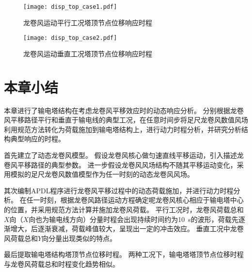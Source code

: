 \begin{figure}[!htpb]
    \centering
    \texttt{[image: disp\_top\_case1.pdf]}
    \caption{龙卷风运动平行工况塔顶节点位移响应时程}
    \label{fig:disp_top_case1}
\end{figure}

\begin{figure}[!htpb]
    \centering
    \texttt{[image: disp\_top\_case2.pdf]}
    \caption{龙卷风运动垂直工况塔顶节点位移响应时程}
    \label{fig:disp_top_case2}
\end{figure}

\section{本章小结}
本章进行了输电塔结构在考虑龙卷风平移效应时的动态响应分析。
分别根据龙卷风平移路径平行和垂直于输电线的典型工况，在任意时间步将足尺龙卷风数值风场利用规范方法转化为荷载施加到输电塔结构上，进行动力时程分析，并研究分析结构典型响应的时程。

首先建立了动态龙卷风模型。
假设龙卷风核心做匀速直线平移运动，引入描述龙卷风平移路径的典型参数。
进一步假设龙卷风风场结构不随其平移运动变化，采用模拟的足尺龙卷风数值模型作为任一时刻的动态龙卷风风场。

其次编制APDL程序进行龙卷风平移过程中的动态荷载施加，并进行动力时程分析。
在任一时刻，根据龙卷风路径运动方程确定呢龙卷风核心相应于输电塔中心的位置，并采用规范方法计算并施加龙卷风荷载。
平行工况时，龙卷风荷载总和$X$向（$X$向也为输电线方向）分量时程会出现持续时间约为\SI{10}{s}的波形，荷载先逐渐增大，后逐渐衰减，荷载峰值较大，呈现出一定的冲击效应。
垂直工况中龙卷风荷载总和$Y$向分量出现类似的特点。

最后提取输电塔结构塔顶节点位移时程。
两种工况下，输电塔塔顶节点位移时程与龙卷风荷载总和时程变化趋势相似。

